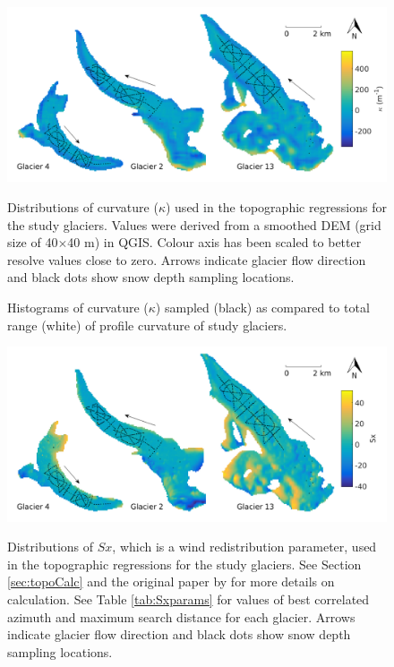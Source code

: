 \documentclass{sfuthesis}
\newcommand{\topomap}{Arrows indicate glacier flow direction and black dots show snow depth sampling locations. }
\begin{document}
\begin{figure}[H]
	\centering
	\includegraphics[width=\textwidth]{Map_curvature.png}\\
	\caption{Distributions of curvature ($\kappa$) used in the topographic regressions for the study glaciers. Values were derived from a smoothed DEM (grid size of 40$\times$40 m) in QGIS. Colour axis has been scaled to better resolve values close to zero. \topomap}
	\label{map:curvature}
\end{figure}

\begin{figure}[H]
	\caption{Histograms of curvature ($\kappa$) sampled (black) as compared to total range (white) of profile curvature of study glaciers.}
	\label{sampledRange:curvature}
\end{figure}

\begin{figure}[H]
	\centering
	\includegraphics[width=\textwidth]{Map_Sx.png}\\
	\caption{Distributions of $Sx$, which is a wind redistribution parameter, used in the topographic regressions for the study glaciers. See Section \ref{sec:topoCalc} and the original paper by \cite{Winstral2002} for more details on calculation. See Table \ref{tab:Sxparams} for values of best correlated azimuth and maximum search distance for each glacier. \topomap }
	\label{map:Sx}
\end{figure}
\end{document}
